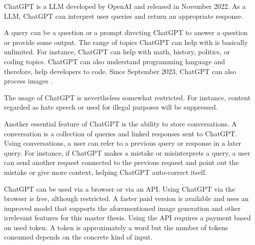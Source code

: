 ChatGPT \cite{ChatGPT_url} is a \ac{LLM} developed by OpenAI and released in November 2022. As a \ac{LLM}, ChatGPT can interpret user queries and return an appropriate response. 

A query can be a question or a prompt directing ChatGPT to answer a question or provide some output. The range of topics ChatGPT can help with is basically unlimited. For instance, ChatGPT can help with math, history, politics, or coding topics. ChatGPT can also understand programming language and therefore, help developers to code. Since September 2023, ChatGPT can also process images \cite{ChatGPT_image}.  

The usage of ChatGPT is nevertheless somewhat restricted. For instance, content regarded as hate speech or used for illegal purposes will be suppressed.

Another essential feature of ChatGPT is the ability to store conversations. A conversation is a collection of queries and linked responses sent to ChatGPT. Using conversations, a user can refer to a previous query or response in a later query. For instance, if ChatGPT makes a mistake or misinterprets a query, a user can send another request connected to the previous request and point out the mistake or give more context, helping ChatGPT auto-correct itself. 

ChatGPT can be used via a browser or via an API. Using ChatGPT via the browser is free, although restricted. A faster paid version is available and uses an improved model that supports the aforementioned image generation and other irrelevant features for this master thesis.  Using the API requires a payment based on used token. A token is approximately a word but the number of tokens consumed depends on the concrete kind of input. 


